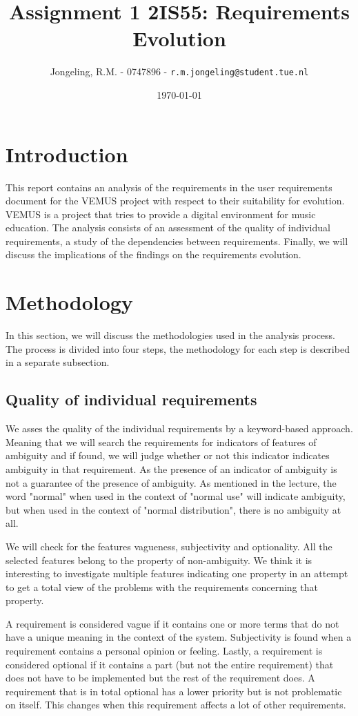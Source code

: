 \documentclass[a4paper,twoside, twocolumn,11pt]{article}
\title{\vspace{-\baselineskip}\sffamily\bfseries Assignment 1 2IS55: Requirements Evolution}
\author{Jongeling, R.M. - 0747896 - {\tt r.m.jongeling@student.tue.nl}}
\date{\today}
\numberwithin{equation}{section}
\begin{document}
\maketitle

\section{Introduction}
This report contains an analysis of the requirements in the user requirements document for the VEMUS project \cite{VEMUS} with respect to their suitability for evolution. VEMUS is a project that tries to provide a digital environment for music education. The analysis consists of an assessment of the quality of individual requirements, a study of the dependencies between requirements. Finally, we will discuss the implications of the findings on the requirements evolution. 

\section{Methodology}
In this section, we will discuss the methodologies used in the analysis process. The process is divided into four steps, the methodology for each step is described in a separate subsection.

\subsection{Quality of individual requirements}
We asses the quality of the individual requirements by a keyword-based approach. Meaning that we will search the requirements for indicators of features of ambiguity and if found, we will judge whether or not this indicator indicates ambiguity in that requirement. As the presence of an indicator of ambiguity is not a guarantee of the presence of ambiguity. As mentioned in the lecture, the word "normal" when used in the context of "normal use" will indicate ambiguity, but when used in the context of "normal distribution", there is no ambiguity at all. 

We will check for the features vagueness, subjectivity and optionality. All the selected features belong to the property of non-ambiguity. We think it is interesting to investigate multiple features indicating one property in an attempt to get a total view of the problems with the requirements concerning that property. 

A requirement is considered vague if it contains one or more terms that do not have a unique meaning in the context of the system. Subjectivity is found when a requirement contains a personal opinion or feeling. Lastly, a requirement is considered optional if it contains a part (but not the entire requirement) that does not have to be implemented but the rest of the requirement does. A requirement that is in total optional has a lower priority but is not problematic on itself. This changes when this requirement affects a lot of other requirements.
\end{document}
